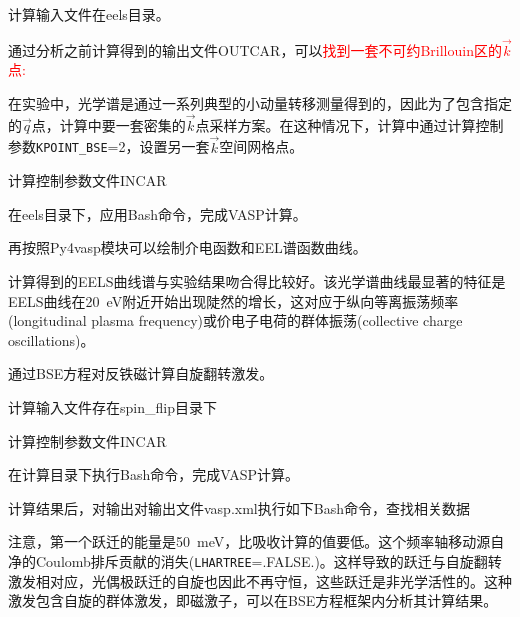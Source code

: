 计算输入文件在\textrm{eels}目录。

通过分析之前计算得到的输出文件\textrm{OUTCAR}，可以\textcolor{red}{找到一套不可约\textrm{Brillouin}区的$\vec k$点:}

在实验中，光学谱是通过一系列典型的小动量转移测量得到的，因此为了包含指定的$\vec q$点，计算中要一套密集的$\vec k$点采样方案。在这种情况下，计算中通过计算控制参数\texttt{KPOINT\_BSE}=2，设置另一套$\vec k$空间网格点。

计算控制参数文件\textrm{INCAR}

在\textrm{eels}目录下，应用\textrm{Bash}命令，完成\textrm{VASP}计算。

再按照\textrm{Py4vasp}模块可以绘制介电函数和\textrm{EEL}谱函数曲线。

计算得到的\textrm{EELS}曲线谱与实验结果吻合得比较好。该光学谱曲线最显著的特征是\textrm{EELS}曲线在\textrm{20~eV}附近开始出现陡然的增长，这对应于纵向等离振荡频率\textrm{(longitudinal plasma frequency)}或价电子电荷的群体振荡\textrm{(collective charge oscillations)}。

通过\textrm{BSE}方程对反铁磁计算自旋翻转激发。

计算输入文件存在\textrm{spin\_flip}目录下

计算控制参数文件\textrm{INCAR}

在计算目录下执行\textrm{Bash}命令，完成\textrm{VASP}计算。

计算结果后，对输出对输出文件\textrm{vasp.xml}执行如下\textrm{Bash}命令，查找相关数据\\

注意，第一个跃迁的能量是\textrm{50~meV}，比吸收计算的值要低。这个频率轴移动源自净的\textrm{Coulomb}排斥贡献的消失\textrm{(\texttt{LHARTREE}=.FALSE.)}。这样导致的跃迁与自旋翻转激发相对应，光偶极跃迁的自旋也因此不再守恒，这些跃迁是非光学活性的。这种激发包含自旋的群体激发，即磁激子，可以在\textrm{BSE}方程框架内分析其计算结果。

